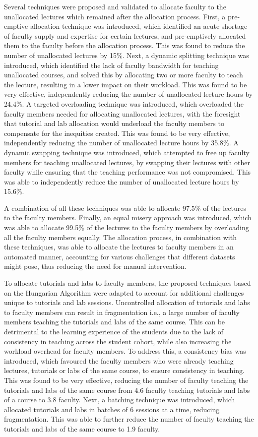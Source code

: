 Several techniques were proposed and validated to allocate faculty to the unallocated lectures which remained after the allocation process. First, a pre-emptive allocation technique was introduced, which identified an acute shortage of faculty supply and expertise for certain lectures, and pre-emptively allocated them to the faculty before the allocation process. This was found to reduce the number of unallocated lectures by 15\%. Next, a dynamic splitting technique was introduced, which identified the lack of faculty bandwidth for teaching unallocated courses, and solved this by allocating two or more faculty to teach the lecture, resulting in a lower impact on their workload. This was found to be very effective, independently reducing the number of unallocated lecture hours by 24.4\%.  A targeted overloading technique was introduced, which overloaded the faculty members needed for allocating unallocated lectures, with the foresight that tutorial and lab allocation would underload the faculty members to compensate for the inequities created. This was found to be very effective, independently reducing the number of unallocated lecture hours by 35.8\%. A dynamic swapping technique was introduced, which attempted to free up faculty members for teaching unallocated lectures, by swapping their lectures with other faculty while ensuring that the teaching performance was not compromised. This was able to independently reduce the number of unallocated lecture hours by 15.6\%.

A combination of all these techniques was able to allocate 97.5\% of the lectures to the faculty members. Finally, an equal misery approach was introduced, which was able to allocate 99.5\% of the lectures to the faculty members by overloading all the faculty members equally. The allocation process, in combination with these techniques, was able to allocate the lectures to faculty members in an automated manner, accounting for various challenges that different datasets might pose, thus reducing the need for manual intervention.

To allocate tutorials and labs to faculty members, the proposed techniques based on the Hungarian Algorithm were adapted to account for additional challenges unique to tutorials and lab sessions. Uncontrolled allocation of tutorials and labs to faculty members can result in fragmentation i.e., a large number of faculty members teaching the tutorials and labs of the same course. This can be detrimental to the learning experience of the students due to the lack of consistency in teaching across the student cohort, while also increasing the workload overhead for faculty members. To address this, a consistency bias was introduced, which favoured the faculty members who were already teaching lectures, tutorials or labs of the same course, to ensure consistency in teaching. This was found to be very effective, reducing the number of faculty teaching the tutorials and labs of the same course from 4.6 faculty teaching tutorials and labs of a course to 3.8 faculty. Next, a batching technique was introduced, which allocated tutorials and labs in batches of 6 sessions at a time, reducing fragmentation. This was able to further reduce the number of faculty teaching the tutorials and labs of the same course to 1.9 faculty.

